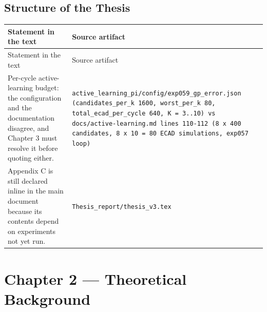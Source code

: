 \subsection*{Structure of the Thesis}
\begingroup\small
\begin{longtable}{p{} p{}}
\hline
Statement in the text & Source artifact \\
\hline
\endfirsthead
\hline
Statement in the text & Source artifact \\
\hline
\endhead
Per-cycle active-learning budget: the configuration and the documentation disagree, and Chapter 3 must resolve it before quoting either. & \texttt{active\_\allowbreak{}learning\_\allowbreak{}pi/\allowbreak{}config/\allowbreak{}exp059\_\allowbreak{}gp\_\allowbreak{}error.json (candidates\_\allowbreak{}per\_\allowbreak{}k 1600, worst\_\allowbreak{}per\_\allowbreak{}k 80, total\_\allowbreak{}ecad\_\allowbreak{}per\_\allowbreak{}cycle 640, K = 3..10) vs docs/\allowbreak{}active-learning.md lines 110-112 (8 x 400 candidates, 8 x 10 = 80 ECAD simulations, exp057 loop)} \\
Appendix C is still declared inline in the main document because its contents depend on experiments not yet run. & \texttt{Thesis\_\allowbreak{}report/\allowbreak{}thesis\_\allowbreak{}v3.tex} \\
\hline
\end{longtable}
\endgroup

\section{Chapter 2 --- Theoretical Background}
\label{sec:appD_ch2}


